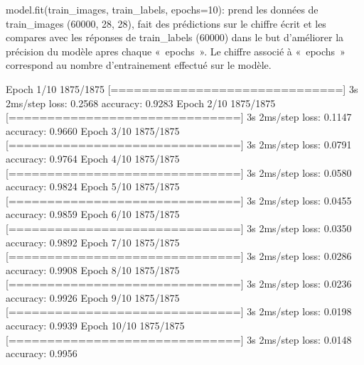 \documentclass[letterpaper,10pt,french]{sphinxmanual}
\begin{document}
\begin{sphinxVerbatim}[commandchars=\\\{\}]
              \PYG{p}{[}\PYG{p}{]}
\end{sphinxVerbatim}

model.fit(train\_images, train\_labels, epochs=10): prend les données de train\_images (60000, 28, 28), fait des prédictions sur le chiffre écrit et les compares avec les réponses de train\_labels (60000) dans le but d’améliorer la précision du modèle apres chaque « epochs ». Le chiffre associé à « epochs » correspond au nombre d’entrainement effectué sur le modèle.

\begin{sphinxVerbatim}[commandchars=\\\{\}]
  
\end{sphinxVerbatim}

\begin{sphinxVerbatim}[commandchars=\\\{\}]
Epoch 1/10
1875/1875 [==============================] \PYGZhy{} 3s 2ms/step \PYGZhy{} loss: 0.2568 \PYGZhy{} accuracy: 0.9283
Epoch 2/10
1875/1875 [==============================] \PYGZhy{} 3s 2ms/step \PYGZhy{} loss: 0.1147 \PYGZhy{} accuracy: 0.9660
Epoch 3/10
1875/1875 [==============================] \PYGZhy{} 3s 2ms/step \PYGZhy{} loss: 0.0791 \PYGZhy{} accuracy: 0.9764
Epoch 4/10
1875/1875 [==============================] \PYGZhy{} 3s 2ms/step \PYGZhy{} loss: 0.0580 \PYGZhy{} accuracy: 0.9824
Epoch 5/10
1875/1875 [==============================] \PYGZhy{} 3s 2ms/step \PYGZhy{} loss: 0.0455 \PYGZhy{} accuracy: 0.9859
Epoch 6/10
1875/1875 [==============================] \PYGZhy{} 3s 2ms/step \PYGZhy{} loss: 0.0350 \PYGZhy{} accuracy: 0.9892
Epoch 7/10
1875/1875 [==============================] \PYGZhy{} 3s 2ms/step \PYGZhy{} loss: 0.0286 \PYGZhy{} accuracy: 0.9908
Epoch 8/10
1875/1875 [==============================] \PYGZhy{} 3s 2ms/step \PYGZhy{} loss: 0.0236 \PYGZhy{} accuracy: 0.9926
Epoch 9/10
1875/1875 [==============================] \PYGZhy{} 3s 2ms/step \PYGZhy{} loss: 0.0198 \PYGZhy{} accuracy: 0.9939
Epoch 10/10
1875/1875 [==============================] \PYGZhy{} 3s 2ms/step \PYGZhy{} loss: 0.0148 \PYGZhy{} accuracy: 0.9956
\end{sphinxVerbatim}
\end{document}
